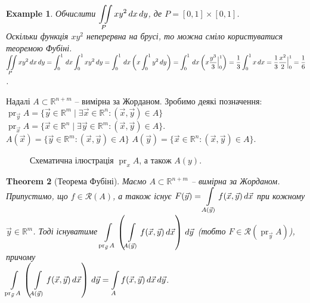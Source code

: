 \documentclass[a4paper, 10pt]{article}
\theoremstyle{theoremdd}
\newtheorem{theorem}{Theorem}[subsection]
\theoremstyle{theoremdd}
\theoremstyle{theoremdd}
\theoremstyle{theoremdd}
\theoremstyle{theoremdd}
\newtheorem{example}[theorem]{Example}
\theoremstyle{theoremdd}
\theoremstyle{theoremdd}
\theoremstyle{theoremdd}
\theoremstyle{theoremdd}
\theoremstyle{theoremdd}
\theoremstyle{theoremdd}
\theoremstyle{theoremdd}
\theoremstyle{theoremdd}
\theoremstyle{theoremdd}
\theoremstyle{theoremdd}
\DeclareMathOperator{\pr}{pr}
\begin{document}
\begin{example}
Обчислити $\displaystyle\iint\displaylimits_P xy^2\,dx\,dy$, де $P = [0,1] \times [0,1]$.\\
Оскільки функція $xy^2$ неперервна на брусі, то можна сміло користуватися теоремою Фубіні.\\
$\displaystyle\iint\displaylimits_P xy^2\,dx\,dy = \int_0^1 \,dx\int_0^1 xy^2\,dy = \int_0^1\,dx \left(x \int_0^1 y^2\,dy\right) = \int_0^1 \,dx \left( x \dfrac{y^3}{3} \Big|_0^1 \right) = \dfrac{1}{3}\int_0^1 x\,dx = \dfrac{1}{3} \dfrac{x^2}{2} \Big|_0^1 = \dfrac{1}{6}$.
\end{example}
\noindent
Надалі $A \subset \mathbb{R}^{n+m}$ -- вимірна за Жорданом. Зробимо деякі позначення:\\
$\pr_{\vec{y}} A = \{ \vec{y} \in \mathbb{R}^m \mid \exists \vec{x} \in \mathbb{R}^n: (\vec{x},\vec{y}) \in A \}$ \qquad $\pr_{\vec{x}} A = \{ \vec{x} \in \mathbb{R}^n \mid \exists \vec{y} \in \mathbb{R}^m: (\vec{x},\vec{y}) \in A \}$.\\
$A(\vec{x}) = \{ \vec{y} \in \mathbb{R}^m: (\vec{x},\vec{y}) \in A \}$ \qquad\qquad\qquad $A(\vec{y}) = \{ \vec{x} \in \mathbb{R}^n: (\vec{x},\vec{y}) \in A \}$.
\begin{figure}[H]
\centering
{}
\caption*{Схематична ілюстрація $\pr_x A$, а також $A(y)$.}
\end{figure}

\begin{theorem}[Теорема Фубіні]
Маємо $A \subset \mathbb{R}^{n+m}$ -- вимірна за Жорданом. Припустимо, що $f \in \mathcal{R}(A)$, а також існує $F(\vec{y}) = \displaystyle\int\displaylimits_{A(\vec{y})} f(\vec{x},\vec{y})\,d\vec{x}$ при кожному $\vec{y} \in \mathbb{R}^m$. Тоді існуватиме $\displaystyle\int\displaylimits_{\pr_{\vec{y}} A} \left( \int\displaylimits_{A(\vec{y})} f(\vec{x},\vec{y})\,d\vec{x} \right)\,d\vec{y}$ (тобто $F \in \mathcal{R}(\pr_{\vec{y}} A)$), причому\\
$\displaystyle\int\displaylimits_{\pr_{\vec{y}} A} \left( \int\displaylimits_{A(\vec{y})} f(\vec{x},\vec{y})\,d\vec{x} \right)\,d\vec{y} = \int\displaylimits_A f(\vec{x},\vec{y})\,d\vec{x}\,d\vec{y}$.
\end{theorem}
\end{document}

